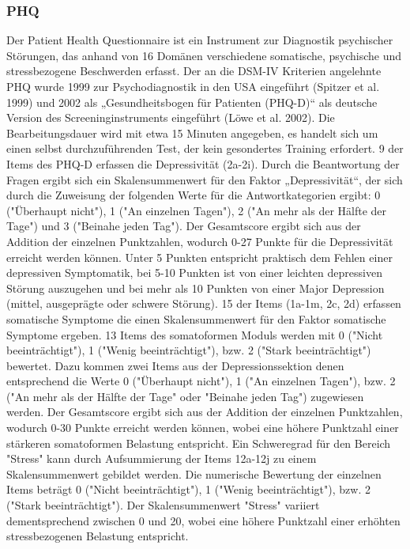 \subsubsection{\acl{PHQ}}
Der Patient Health Questionnaire ist ein Instrument zur Diagnostik psychischer Störungen, das anhand von 16 Domänen verschiedene somatische, psychische und stressbezogene Beschwerden erfasst. Der an die DSM-IV Kriterien angelehnte PHQ wurde 1999 zur Psychodiagnostik in den USA eingeführt (Spitzer et al. 1999) und 2002 als „Gesundheitsbogen für Patienten (PHQ-D)“ als deutsche Version des Screeninginstruments eingeführt (Löwe et al. 2002).
Die Bearbeitungsdauer wird mit etwa 15 Minuten angegeben, es handelt sich um einen selbst durchzuführenden Test, der kein gesondertes Training erfordert. 
9 der Items des PHQ-D erfassen die Depressivität (2a-2i). Durch die Beantwortung der Fragen ergibt sich ein Skalensummenwert für den Faktor „Depressivität“, der sich durch die Zuweisung der folgenden Werte für die Antwortkategorien ergibt: 0 ("Überhaupt nicht"), 1 ("An einzelnen Tagen"), 2 ("An mehr als der Hälfte der Tage") und 3 ("Beinahe jeden Tag"). Der Gesamtscore ergibt sich aus der Addition der einzelnen Punktzahlen, wodurch 0-27 Punkte für die Depressivität erreicht werden können. Unter 5 Punkten entspricht praktisch dem Fehlen einer depressiven Symptomatik, bei 5-10 Punkten ist von einer leichten depressiven Störung auszugehen und bei mehr als 10 Punkten von einer Major Depression (mittel, ausgeprägte oder schwere Störung). 
15 der Items (1a-1m, 2c, 2d) erfassen somatische Symptome die einen Skalensummenwert für den Faktor somatische Symptome ergeben. 13 Items des somatoformen Moduls werden mit 0 ("Nicht beeinträchtigt"), 1 ("Wenig beeinträchtigt"), bzw. 2 ("Stark beeinträchtigt") bewertet. Dazu kommen zwei Items aus der Depressionssektion denen entsprechend die Werte 0 ("Überhaupt nicht"), 1 ("An einzelnen Tagen"), bzw. 2 ("An mehr als der Hälfte der Tage" oder "Beinahe jeden Tag") zugewiesen werden. Der Gesamtscore ergibt sich aus der Addition der einzelnen Punktzahlen, wodurch 0-30 Punkte erreicht werden können, wobei eine höhere Punktzahl einer stärkeren somatoformen Belastung entspricht. 
Ein Schweregrad für den Bereich "Stress" kann durch Aufsummierung der Items 12a-12j zu einem Skalensummenwert gebildet werden. Die numerische Bewertung der einzelnen Items beträgt 0 ("Nicht beeinträchtigt"), 1 ("Wenig beeinträchtigt"), bzw. 2 ("Stark beeinträchtigt"). Der Skalensummenwert "Stress" variiert dementsprechend zwischen 0 und 20, wobei eine höhere Punktzahl einer erhöhten stressbezogenen Belastung entspricht.


